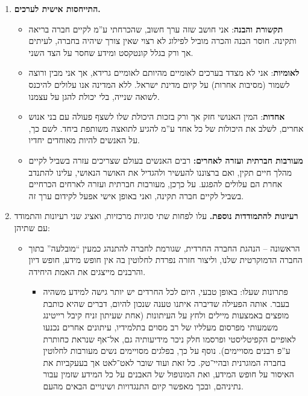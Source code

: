\documentclass[]{article}
\begin{document}
\begin{enumerate}
        \item \textbf{התייחסות אישית לערכים. }
        \begin{itemize}
            \item \textbf{תקשורת והבנה}: אני חושב שזה ערך חשוב, שהכרחתי ע''מ לקיים חברה בריאה ותקינה. חוסר הבנה והכרה מוביל לפילוג לא רצוי שאין צורך שיהיה בחברה, לעיתים אך ורק בגלל קונטקסט ומידע שחסר על הצד השני. 
            \item \textbf{לאומיות}: אני לא מצדד בערכים לאומיים מהיותם לאומיים גרידא, אך אני מבין ורוצה לשמור (מסיבות אחרות) על קיום מדינת ישראל. ללא המדינה אנו עלולים להיכנס לשואה שנייה, בלי יכולת להגן על עצמנו. 
            \item \textbf{אחדות}: המין האנושי חזק אך ורק בזכות היכולת שלו לשצף פעולה עם בני אנוש אחרים, לשלב את היכולות של כל אחד ע''מ להגיע לתואצה משותפת ביחד. לשם כך, על האנשים להיות מאוחדים יחדיו. 
            \item \textbf{מעורבות חברתית ועזרה לאחרים: }רבים האנשים בעולם שצריכים עזרה בשביל לקיים מהלך חיים תקין, ואם ברצוננו להעשיר ולהגדיל את האושר הנאושי, עלינו להתנדב אחרת הם עלולים להפגע. על כךכן, מעורבות חברתית ועזרה לארחים הכרחיים בשביל לקיים חברה תקינה, ואני באופן אישי אפעל לקידום ערך זה. 
        \end{itemize}
        \item \textbf{רעיונות להתמודדות נוספת. }עלו לפחות שתי סוגיות מרכזיות, ואציג שני רעיונות והתמודד עם שתיהן: 
        \begin{itemize}
            \item הראשונה – הנהגת החברה החרדית, שגורמת לחברה להתנהג כמעין ``מובלעה'' בתוך החברה הדמוקרטית שלנו, וליצור חזרה נפרדת לחלוטין בה אין חופש מידע, חופש דיון והרבנים מייצגים את האמת היחידה. 
            \begin{itemize}
                \item פתרונות שעלו: באופן טבעי, היום לכל החרדים יש יותר גישה למידע משהיה בעבר. אותה הפעילה שדיברה איתנו טענה שנכון להיום, דברים שהיא כותבת מופצים באמצעות מיילים ולחץ על העיתונות (אחת שעיתון זניח קיבל רייטינג משמעותי מפרסום מעלליו של רב מסוים בתלמידיו, עיתונים אחרים נכנעו לאופיים הקפיטליסטי ופרסמו חלק ניכר מידיעותיה גם, אל־אף שנראת כחותרת ע''פ רבנים מסויימים). נוסף על כך, בפלגים מסויימים נשים מעורבות לחלוטין בחברה המוגרנית ובהיי־טק. כל זאת ועוד שובר לאט־לאט אך בעעקביות את האיסור על חופש המידע, ואת המונופול של האבנים על כל המידע שזמין עבור נתיניהם, ובכך מאפשר קיום התנגדויות ושינויים הבאים מהעם. 
                

\end{itemize}
\end{itemize}
\end{enumerate}
\end{document}
